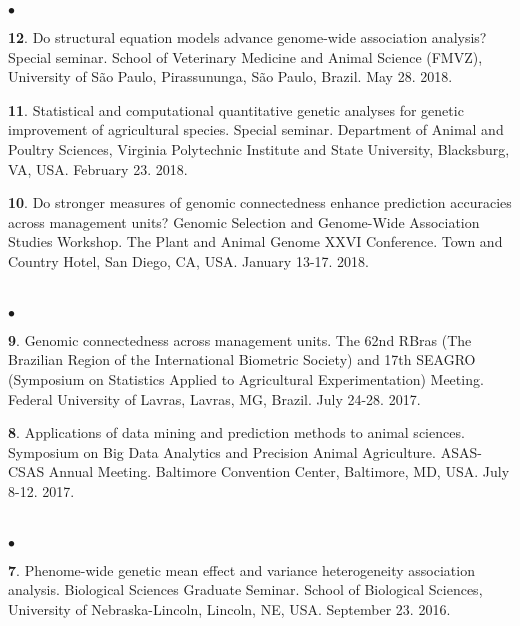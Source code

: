 \documentclass[margin,line,10pt]{res}
\newenvironment{list2}{
  \begin{list}{$\bullet$}{%
      \setlength{\itemsep}{0in}
      \setlength{\parsep}{0in} \setlength{\parskip}{0in}
      \setlength{\topsep}{0in} \setlength{\partopsep}{0in} 
      \setlength{\leftmargin}{0.2in}}}{\end{list}}
\begin{document}
\begin{resume}
\begin{list2}
  
\item [{\bf 12}.] Do structural equation models advance genome-wide association analysis? Special seminar. School of Veterinary Medicine and Animal Science (FMVZ), University of S\~{a}o Paulo, Pirassununga, S\~{a}o Paulo, Brazil.  May 28. 2018.

    \vspace{0.5cm}
    
\item [{\bf 11}.]  Statistical and computational quantitative genetic analyses for genetic improvement of agricultural species. Special seminar.  Department of Animal and Poultry Sciences, Virginia Polytechnic Institute and State University, Blacksburg, VA, USA. February 23. 2018.

  \vspace{0.5cm}
  
\item [{\bf 10}.] Do stronger measures of genomic connectedness enhance prediction accuracies across management units?  Genomic Selection and Genome-Wide Association Studies Workshop. The Plant and Animal Genome XXVI Conference. Town and Country Hotel, San Diego, CA, USA. January 13-17. 2018. 
  
\end{list2}


\section{}
\begin{list2}
\item [{\bf 9}.] Genomic connectedness across management units. The 62nd RBras (The Brazilian Region of the International Biometric Society) and 17th SEAGRO (Symposium on Statistics Applied to Agricultural Experimentation) Meeting. Federal University of Lavras, Lavras, MG, Brazil. July 24-28. 2017.
  
  \vspace{0.5cm}
  
  \item [{\bf 8}.] Applications of data mining and prediction methods to animal sciences. Symposium on Big Data Analytics and Precision Animal Agriculture. ASAS-CSAS Annual Meeting. Baltimore Convention Center, Baltimore, MD, USA. July 8-12. 2017.
  
\end{list2}



\section{}
\begin{list2}
\item [{\bf 7}.] Phenome-wide genetic mean effect and variance heterogeneity association analysis. Biological Sciences Graduate Seminar. School of Biological Sciences, University of Nebraska-Lincoln, Lincoln, NE, USA. September 23. 2016.
  

\end{list2}
\end{resume}
\end{document}
